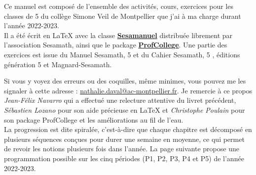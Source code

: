 

Ce manuel est composé de l'ensemble des activités, cours, exercices pour les classes de 5 du collège Simone Veil de Montpellier que j'ai à ma charge durant l'année 2022-2023. \\ [1mm]
Il a été écrit en \LaTeX{} avec la classe \href{https://www.ctan.org/pkg/sesamanuel}{\bf Sesamanuel} distribuée librement par l'association Sesamath, ainsi que le package \href{https://www.ctan.org/pkg/ProfCollege}{\bf ProfCollege}. Une partie des exercices est issue du \og Manuel Sesamath, 5 \fg{} et du \og Cahier Sesamath, 5 \fg, éditions génération 5 et Magnard-Sesamath.

Si vous y voyez des erreurs ou des coquilles, même minimes, vous pouvez me les signaler à cette adresse : \href{mailto:nathalie.daval@ac-montpellier.fr}{nathalie.daval@ac-montpellier.fr}. Je remercie à ce propos {\it Jean-Félix Navarro} qui a effectué une relecture attentive du livret précédent, {\it Sébastien Lozano} pour son aide précieuse en \LaTeX{} et {\it Christophe Poulain} pour son package ProfCollege et les améliorations au fil de l'eau.  \\ [10mm]

La progression est dite spiralée, c'est-à-dire que chaque \og chapitre \fg{} est décomposé en plusieurs séquences conçues pour durer une semaine en moyenne, ce qui permet de revoir les notions plusieurs fois dans l'année. La page suivante propose une programmation possible sur les cinq périodes (P1, P2, P3, P4 et P5) de l'année 2022-2023.

